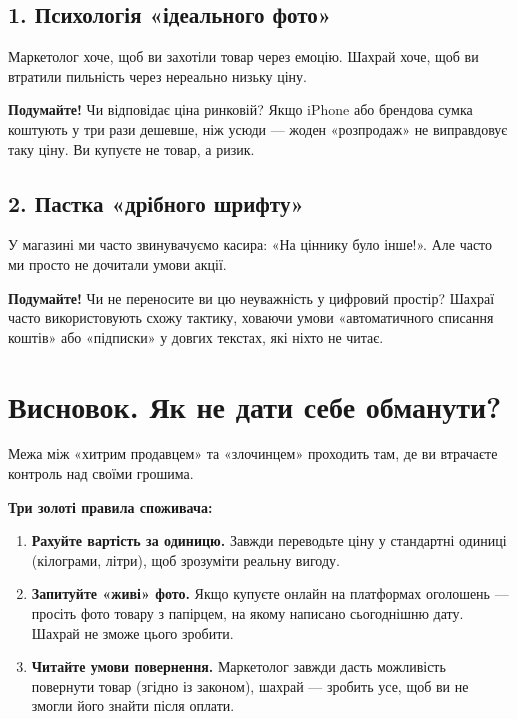 \subsection*{1. Психологія «ідеального фото»}
Маркетолог хоче, щоб ви захотіли товар через емоцію. Шахрай хоче, щоб ви втратили пильність через нереально низьку ціну.

\textbf{Подумайте!} Чи відповідає ціна ринковій? Якщо iPhone або брендова сумка коштують у три рази дешевше, ніж усюди — жоден «розпродаж» не виправдовує таку ціну. Ви купуєте не товар, а ризик.

\vspace{0.25cm}

\subsection*{2. Пастка «дрібного шрифту»}
У магазині ми часто звинувачуємо касира: «На ціннику було інше!». Але часто ми просто не дочитали умови акції. 

\textbf{Подумайте!} Чи не переносите ви цю неуважність у цифровий простір? Шахраї часто використовують схожу тактику, ховаючи умови «автоматичного списання коштів» або «підписки» у довгих текстах, які ніхто не читає.

 

\section*{Висновок. Як не дати себе обманути?}
\vspace{-0.1cm}

Межа між «хитрим продавцем» та «злочинцем» проходить там, де ви втрачаєте контроль над своїми грошима. 

 

\textbf{Три золоті правила споживача:}
\begin{enumerate}[itemsep=3pt, parsep=0pt]
    \item \textbf{Рахуйте вартість за одиницю.} Завжди переводьте ціну у стандартні одиниці (кілограми, літри), щоб зрозуміти реальну вигоду. 
    \item \textbf{Запитуйте «живі» фото.} Якщо купуєте онлайн на платформах оголошень — просіть фото товару з папірцем, на якому написано сьогоднішню дату. Шахрай не зможе цього зробити.
    \item \textbf{Читайте умови повернення.} Маркетолог завжди дасть можливість повернути товар (згідно із законом), шахрай — зробить усе, щоб ви не змогли його знайти після оплати.
\end{enumerate}


\newpage
